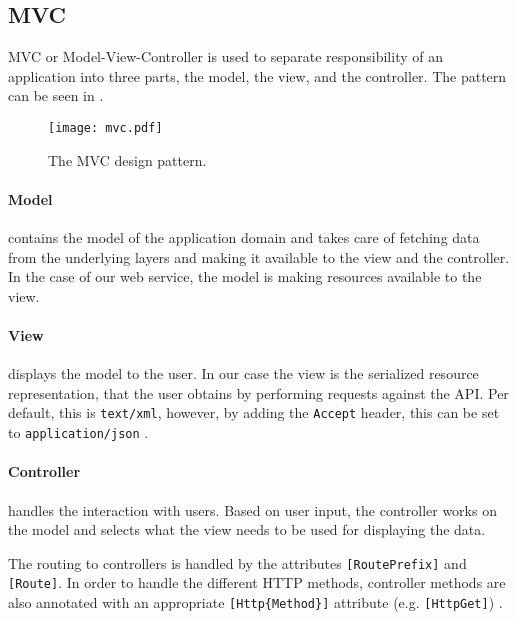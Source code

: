 \subsection{MVC} 
MVC or Model-View-Controller\cite{aspmvc} is used to separate responsibility of an application into three parts, the model, the view, and the controller.
The pattern can be seen in .

\begin{figure}[h]
\begin{center}
\texttt{[image: mvc.pdf]}
\caption{The MVC design pattern.}
\label{mvcdiagram}
\end{center}
\end{figure}

\paragraph{Model} contains the model of the application domain and takes care of fetching data from the underlying layers and making it available to the view and the controller.
In the case of our web service, the model is making resources available to the view.

\paragraph{View} displays the model to the user.
In our case the view is the serialized resource representation, that the user obtains by performing requests against the API.
Per default, this is \texttt{text/xml}, however, by adding the \texttt{Accept} header, this can be set to \texttt{application/json} \cite[Section 14]{http_specification}.

\paragraph{Controller} handles the interaction with users.
Based on user input, the controller works on the model and selects what the view needs to be used for displaying the data.

The routing to controllers is handled by the attributes \texttt{[RoutePrefix]} and \texttt{[Route]}.
In order to handle the different HTTP methods, controller methods are also annotated with an appropriate \texttt{[Http\{Method\}]} attribute (e.g. \texttt{[HttpGet]}) \cite{asp_routing}.
